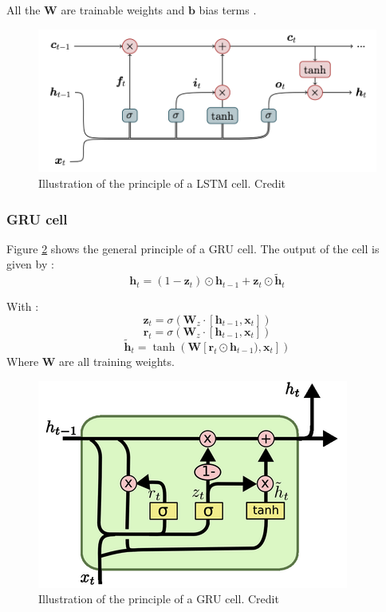 \documentclass[final]{cvpr}
\begin{document}
All the $\pmb{W}$ are trainable weights and $\pmb{b}$ bias terms
.

\begin{figure}[t]
	\begin{center}
		\includegraphics[width=0.95\linewidth]{LSTM_cell}
	\end{center}
	\caption{Illustration of the principle of a LSTM cell. Credit \cite{Koch}}
	\label{LSTM}
\end{figure}

\subsubsection*{GRU cell}
Figure \ref{GRU} shows the general principle of a GRU cell. The output of the cell is given by : 
$$\pmb{h}_t=(1-\pmb{z}_t)\odot{\pmb{h}_{t-1}}+\pmb{z}_t\odot{\tilde{\pmb{h}}_{t}}$$

With : 
$$\pmb{z}_t=\sigma(\pmb{W}_z\cdot[\pmb{h}_{t-1},\pmb{x}_t])$$
$$\pmb{r}_t=\sigma(\pmb{W}_z\cdot[\pmb{h}_{t-1},\pmb{x}_t])$$
$$\tilde{\pmb{h}}_t=\tanh(\pmb{W}[\pmb{r}_t\odot\pmb{h}_{t-1}),\pmb{x}_t])$$
Where $\pmb{W}$ are all training weights.

\begin{figure}[t]
	\begin{center}
		\includegraphics[width=0.95\linewidth]{GRU}
	\end{center}
	\caption{Illustration of the principle of a GRU cell. Credit \cite{GRU}}
	\label{GRU}
\end{figure}
\end{document}
